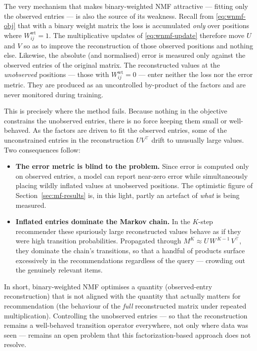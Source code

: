 The very mechanism that makes binary-weighted NMF attractive --- fitting only
the observed entries --- is also the source of its weakness. Recall from
\eqref{eq:wnmf-obj} that with a binary weight matrix the loss is accumulated
\emph{only} over positions where $W^{\mathrm{wt}}_{ij}=1$. The multiplicative
updates of \eqref{eq:wnmf-update} therefore move $U$ and $V$ so as to improve
the reconstruction of those observed positions and nothing else. Likewise, the
absolute (and normalised) error is measured only against the observed entries
of the original matrix. The reconstructed values at the \emph{unobserved}
positions --- those with $W^{\mathrm{wt}}_{ij}=0$ --- enter neither the loss nor
the error metric. They are produced as an uncontrolled by-product of the
factors and are never monitored during training.

This is precisely where the method fails. Because nothing in the objective
constrains the unobserved entries, there is no force keeping them small or
well-behaved. As the factors are driven to fit the observed entries, some of
the unconstrained entries in the reconstruction $U V^{\top}$ drift to
unusually large values. Two consequences follow:

\begin{itemize}
  \item \textbf{The error metric is blind to the problem.} Since error is
        computed only on observed entries, a model can report near-zero error
        while simultaneously placing wildly inflated values at unobserved
        positions. The optimistic figure of Section~\ref{sec:mf-results} is, in
        this light, partly an artefact of \emph{what} is being measured.
  \item \textbf{Inflated entries dominate the Markov chain.} In the $K$-step
        recommender these spuriously large reconstructed values behave as if
        they were high transition probabilities. Propagated through
        $M^{K}\approx U\,W^{\,K-1}\,V^{\top}$, they dominate the chain's
        transitions, so that a handful of products surface excessively in the
        recommendations regardless of the query --- crowding out the genuinely
        relevant items.
\end{itemize}

In short, binary-weighted NMF optimises a quantity (observed-entry
reconstruction) that is not aligned with the quantity that actually matters for
recommendation (the behaviour of the \emph{full} reconstructed matrix under
repeated multiplication). Controlling the unobserved entries --- so that the
reconstruction remains a well-behaved transition operator everywhere, not only
where data was seen --- remains an open problem that this factorization-based
approach does not resolve.
